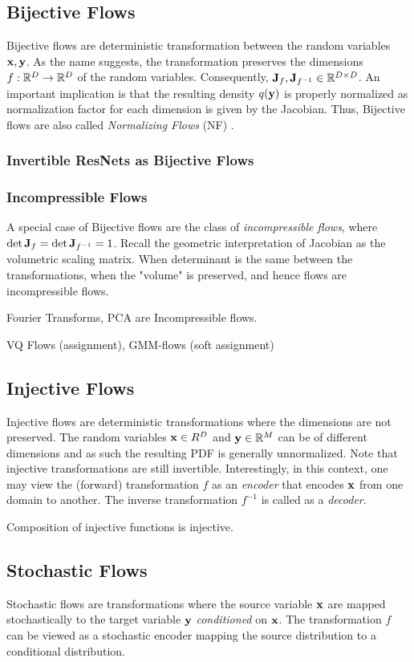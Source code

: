 \documentclass[a4paper, 11pt]{article}
\begin{document}
\subsection{Bijective Flows}
Bijective flows are deterministic transformation between the random variables $\mbox{$\mbox{$\mathbf{x}$}$}, \mbox{$\mbox{$\mathbf{y}$}$}$. As the name suggests, the transformation preserves the dimensions $f: \mathbb{R}^D \to \mathbb{R}^D$ of the random variables. Consequently, $\mbox{$\mbox{$\mathbf{J}$}$}_{f}, \mbox{$\mbox{$\mathbf{J}$}$}_{f^{-1}} \in \mathbb{R}^{D \times D}$. An important implication is that the resulting density $q(\mbox{$\mbox{$\mathbf{y}$}$})$ is properly normalized as normalization factor for each dimension is given by the Jacobian. Thus, Bijective flows are also called \emph{Normalizing Flows} (NF) \citep{papamakarios2021normalizing}. 

\subsubsection{Invertible ResNets as Bijective Flows}


\subsubsection{Incompressible Flows}
A special case of Bijective flows are the class of \emph{incompressible flows}, where $\det \mbox{$\mbox{$\mathbf{J}$}$}_f = \det \mbox{$\mbox{$\mathbf{J}$}$}_{f^{-1}} = 1$. Recall the geometric interpretation of Jacobian as the volumetric scaling matrix. When determinant is the same between the transformations, when the "volume" is preserved, and hence flows are incompressible flows. 

Fourier Transforms, PCA are Incompressible flows. 

VQ Flows (assignment), GMM-flows (soft assignment)


\subsection{Injective Flows}
Injective flows are deterministic transformations where the dimensions are not preserved. The random variables $\mbox{$\mbox{$\mathbf{x}$}$} \in R^D$ and $\mbox{$\mbox{$\mathbf{y}$}$} \in \mathbb{R}^M$ can be of different dimensions and as such the resulting PDF is generally unnormalized. Note that injective transformations are still invertible. Interestingly, in this context, one may view the (forward) transformation $f$ as an \emph{encoder} that encodes $\mbox{$\mbox{$\mathbf{x}$}$}$ from one domain to another. The inverse transformation $f^{-1}$ is called as a \emph{decoder}.


Composition of injective functions is injective.


\subsection{Stochastic Flows}
Stochastic flows are transformations where the source variable $\mbox{$\mbox{$\mathbf{x}$}$}$ are mapped stochastically to the target variable $\mbox{$\mbox{$\mathbf{y}$}$}$ \emph{conditioned} on $\mbox{$\mbox{$\mathbf{x}$}$}$. The transformation $f$ can be viewed as a stochastic encoder mapping the source distribution to a conditional distribution.
\end{document}
